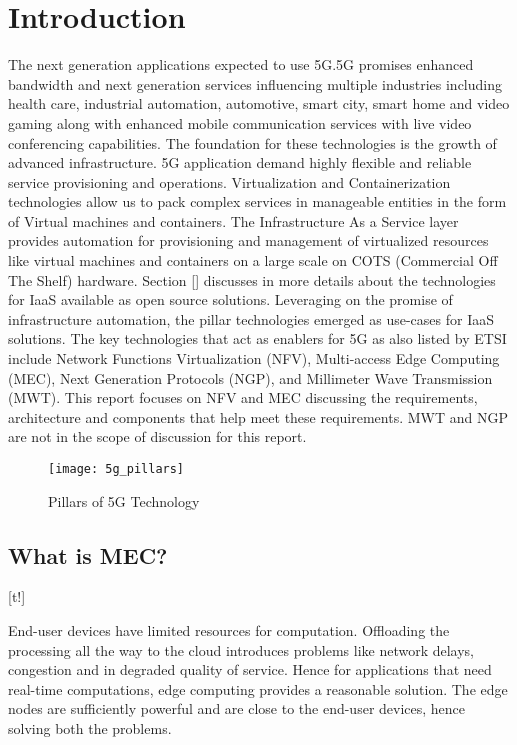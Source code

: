 \section{Introduction}


The next generation applications expected to use 5G.5G promises enhanced bandwidth and next generation services influencing multiple industries including health care, industrial automation, automotive, smart city, smart home and video gaming along with enhanced mobile communication services with live video conferencing capabilities. The foundation for these technologies is the growth of advanced infrastructure. 5G application demand highly flexible and reliable service provisioning and operations. Virtualization and Containerization technologies allow us to pack complex services in manageable entities in the form of Virtual machines and containers. The Infrastructure As a Service layer provides automation for provisioning and management of virtualized resources like virtual machines and containers on a large scale on COTS (Commercial Off The Shelf) hardware. Section [] discusses in more details about the technologies for IaaS available as open source solutions. Leveraging on the promise of infrastructure automation, the pillar technologies emerged as use-cases for IaaS solutions. The key technologies that act as enablers for 5G as also listed by ETSI include Network Functions Virtualization (NFV), Multi-access Edge Computing (MEC), Next Generation Protocols (NGP), and Millimeter Wave Transmission (MWT). This report focuses on NFV and MEC discussing the requirements, architecture and components that help meet these requirements. MWT and NGP are not in the scope of discussion for this report.

\begin{figure}[h!]
	\centering
	\texttt{[image: 5g\_pillars]}
	\label{fig:figure1}
	\caption{Pillars of 5G Technology}
\end{figure}

\subsection{What is MEC?}[t!]

End-user devices have limited resources for computation. Offloading the processing all the way to the cloud introduces problems like network delays, congestion and in degraded quality of service. Hence for applications that need real-time computations, edge computing provides a reasonable solution. The edge nodes are sufficiently powerful and are close to the end-user devices, hence solving both the problems.

